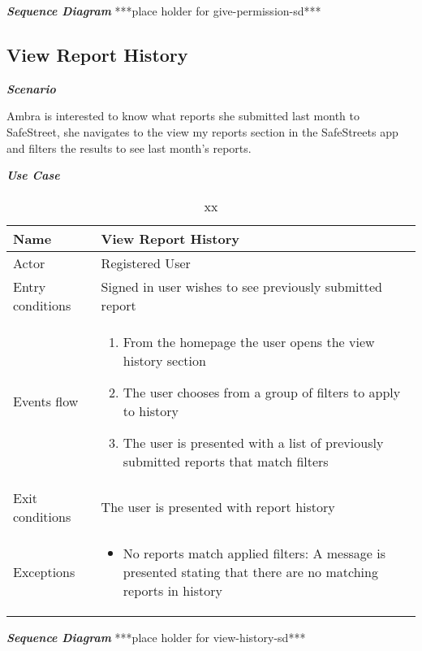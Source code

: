 \emph{\textbf{Sequence Diagram}}
***place holder for give-permission-sd***

\subsection{View Report History}

\emph{\textbf{Scenario}}

Ambra is interested to know what reports she submitted last month to SafeStreet, she navigates to the view my reports section in the SafeStreets app and filters the results to see last month’s reports.

\emph{\textbf{Use Case}}

\begin{table}[!hbtp]
\footnotesize
\centering
\settowidth{}
\setlength\extrarowheight{2pt}
\begin{tabulary}{\textwidth}{|J|J|}
\hline
Name             & View Report History \\
\hline 
Actor            & Registered User \\ 
\hline 
Entry conditions & Signed in user wishes to see previously submitted report\\
\hline 
Events flow      & 
\begin{minipage}[t]{0.7\textwidth}
\begin{enumerate} 
\item From the homepage the user opens the view history section
\item The user chooses from a group of filters to apply to history
\item The user is presented with a list of previously submitted reports that match filters
\end{enumerate}
\end{minipage}\\
\hline
Exit conditions  & The user is presented with report history \\
\hline 
Exceptions       & 
\begin{minipage}[t]{0.8\textwidth}
\begin{itemize} 
\item No reports match applied filters: A message is presented stating that there are no matching reports in history
\end{itemize}
\end{minipage}\\
\hline
\end{tabulary}
\caption{\label{tab:xx}xx}
\end{table}
\emph{\textbf{Sequence Diagram}}
***place holder for view-history-sd***
